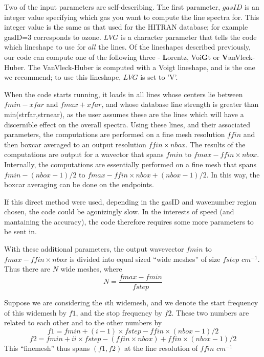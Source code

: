 \documentclass[11pt]{article}
\begin{document}
Two of the input parameters are self-describing. The first parameter, 
$gasID$ is an integer value specifying which gas you want to compute the 
line spectra for. This integer value is the same as that used for the 
HITRAN database; for example gasID=3 corresponds to ozone. $LVG$ is a
character parameter that tells the code which lineshape to use for $all$ 
the lines. Of the lineshapes described previously, our code can compute 
one of the following three - \textbf{L}orentz, Voi\textbf{G}t or 
\textbf{V}anVleck-Huber. The 
VanVleck-Huber is computed with a Voigt lineshape, and is the one we 
recommend; to use this lineshape, $LVG$ is set to 'V'.

When the code starts running, it loads in all lines whose centers lie 
between $fmin - xfar$ and $fmax + xfar$, and whose database line strength 
is greater than min(strfar,strnear), as the user assumes these are the 
lines which will have a discernible effect on the overall spectra. Using 
these lines, and their associated parameters, the computations are 
performed on a fine mesh resolution $ffin$ and then boxcar
averaged to an output resolution $ffin \times nbox$. The results of the 
computations are output for a wavector that spans $fmin$ to $fmax-ffin 
\times nbox$. Internally, the computations are essentially performed on a 
fine mesh that spans $fmin - (nbox-1)/2 $ to $fmax-ffin \times nbox + 
(nbox-1)/2$. In this way, the boxcar averaging can be done on the endpoints.

If this direct method were used, depending in the gasID and wavenumber 
region chosen, the code could be agonizingly slow. In the interests of 
speed (and mantaining the accuracy), the code therefore requires some more 
parameters to be sent in. 

With these additional parameters, the output wavevector $fmin$ to 
$fmax-ffin \times nbox$ is divided into equal sized ``wide meshes'' of 
size $fstep$ $cm^{-1}$. Thus there are $N$ wide meshes, where
\begin{equation}
N = \frac{fmax-fmin}{fstep}
\end{equation}

Suppose we are considering the $i$th  widemesh, and we denote the start 
frequency  of this widemesh by $f1$, and the stop frequency by $f2$. These 
two numbers are related to each other and to the other numbers by 
\begin{displaymath}
f1 = fmin + (i-1) \times fstep - ffin \times (nbox-1)/2 
\end{displaymath}
\begin{equation}
f2 = fmin + ii \times fstep - (ffin \times nbox) + ffin \times (nbox-1)/2
\end{equation}
This ``finemesh'' thus spans $(f1,f2)$ at the fine resolution of 
$ffin$ $cm^{-1}$
\end{document}
